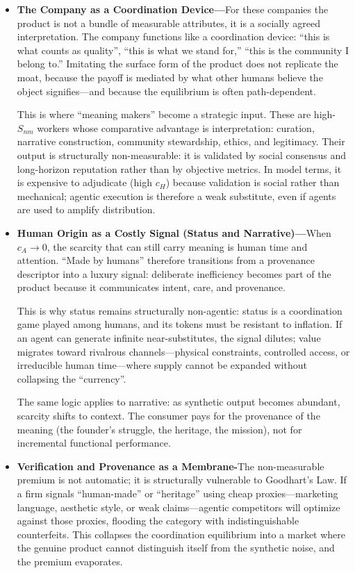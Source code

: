 \documentclass[12pt, letter]{article}
\begin{document}
\begin{itemize}

\item \textbf{The Company as a Coordination Device—}For these companies the product is not a bundle of measurable attributes, it is a socially agreed interpretation. The company functions like a coordination device: ``this is what counts as quality'', ``this is what we stand for,'' ``this is the community I belong to.'' Imitating the surface form of the product does not replicate the moat, because the payoff is mediated by what other humans believe the object signifies---and because the equilibrium is often path-dependent.

This is where ``meaning makers'' become a strategic input. These are high-$S_{nm}$ workers whose comparative advantage is interpretation: curation, narrative construction, community stewardship, ethics, and legitimacy. Their output is structurally non-measurable: it is validated by social consensus and long-horizon reputation rather than by objective metrics. In model terms, it is expensive to adjudicate (high $c_H$) because validation is social rather than mechanical; agentic execution is therefore a weak substitute, even if agents are used to amplify distribution.

\item \textbf{Human Origin as a Costly Signal (Status and Narrative)—}When $c_A \to 0$, the scarcity that can still carry meaning is human time and attention. ``Made by humans'' therefore transitions from a provenance descriptor into a luxury signal: deliberate inefficiency becomes part of the product because it communicates intent, care, and provenance. 

This is why status remains structurally non-agentic: status is a coordination game played among humans, and its tokens must be resistant to inflation. If an agent can generate infinite near-substitutes, the signal dilutes; value migrates toward rivalrous channels—physical constraints, controlled access, or irreducible human time—where supply cannot be expanded without collapsing the ``currency''. 

The same logic applies to narrative: as synthetic output becomes abundant, scarcity shifts to context. The consumer pays for the provenance of the meaning (the founder's struggle, the heritage, the mission), not for incremental functional performance.

\item \textbf{Verification and Provenance as a Membrane-}The non-measurable premium is not automatic; it is structurally vulnerable to Goodhart’s Law. If a firm signals ``human-made'' or ``heritage'' using cheap proxies—marketing language, aesthetic style, or weak claims—agentic competitors will optimize against those proxies, flooding the category with indistinguishable counterfeits. This collapses the coordination equilibrium into a market where the genuine product cannot distinguish itself from the synthetic noise, and the premium evaporates.


\end{itemize}
\end{document}

